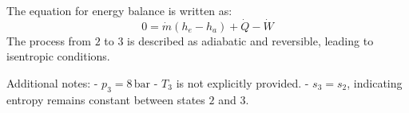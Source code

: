 The equation for energy balance is written as:  
\[
0 = \dot{m} (h_e - h_a) + \dot{Q} - \dot{W}
\]  
The process from \(2\) to \(3\) is described as adiabatic and reversible, leading to isentropic conditions.  

Additional notes:  
- \(p_3 = 8 \, \text{bar}\)  
- \(T_3\) is not explicitly provided.  
- \(s_3 = s_2\), indicating entropy remains constant between states \(2\) and \(3\).